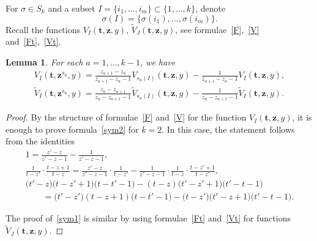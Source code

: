 \documentclass[pdftex]{sigma}
\numberwithin{equation}{section}
\newtheorem{Lemma}[Theorem]{Lemma}
\begin{document}
For $\sigma\in S_k$ and a subset $I=\{i_1,\dots,i_m\}\subset\{1,\dots,k\}$, denote
\begin{equation*}\sigma (I)=\{\sigma(i_1),\dots,\sigma(i_m)\}.\end{equation*}
Recall the functions $V_I(\boldsymbol{t},\boldsymbol{z},y)$, $\widetilde{V}_J(\boldsymbol{t},\boldsymbol{z},y)$, see formulae~\eqref{F},~\eqref{V} and~\eqref{Ft},~\eqref{Vt}.

\begin{Lemma}
For each $a=1,\dots, k-1$, we have
\begin{gather}\label{sym2}
V_{I}(\boldsymbol{t},\boldsymbol{z}^{s_a}\!,y)=\frac{z_{a+1}-z_a}{z_{a+1}-z_{a}-1}V_{s_a(I)}(\boldsymbol{t},\boldsymbol{z},y)-\frac{1}{z_{a+1}-z_{a}-1}V_{I}(\boldsymbol{t},\boldsymbol{z},y),
\\ \label{sym1}
\widetilde{V}_I(\boldsymbol{t},\boldsymbol{z}^{s_a}\!,y)=\frac{z_a-z_{a+1}}{z_a-z_{a+1}-1}\widetilde{V}_{s_a(I)}(\boldsymbol{t},\boldsymbol{z},y)-\frac{1}{z_a-z_{a+1}-1}\widetilde{V}_I(\boldsymbol{t},\boldsymbol{z},y).
\end{gather}
\end{Lemma}

\begin{proof}
By the structure of formulae~\eqref{F} and~\eqref{V} for the function $V_I(\boldsymbol{t},\boldsymbol{z},y)$, it is enough to prove formula~\eqref{sym2} for $k=2$. In this case, the statement follows from the identities
\begin{gather*}
1=\frac{z'-z}{z'-z-1}-\frac{1}{z'-z-1},
\\
\frac{1}{t-z'}\cdot\frac{t-z+1}{t-z}=\frac{z'-z}{z'-z-1}\cdot\frac{1}{t-z'}-\frac{1}{z'-z-1}\cdot\frac{1}{t-z}\cdot\frac{t-z'+1}{t-z'},
\\
\bigl(t'-z\bigr)\bigl(t-z'+1\bigr)\bigl(t-t'-1\bigr)-(t-z)\bigl(t'-z'+1\bigr)\bigl(t'-t-1\bigr)\\
\qquad{}=\bigl(t'-z'\bigr)(t-z+1)\bigl(t-t'-1\bigr)-\bigl(t-z'\bigr)\bigl(t'-z+1\bigr)\bigl(t'-t-1\bigr).
\end{gather*}

The proof of~\eqref{sym1} is similar by using formulae~\eqref{Ft} and~\eqref{Vt} for functions $\widetilde{V}_J(\boldsymbol{t},\boldsymbol{z},y)$.
\end{proof}
\end{document}
